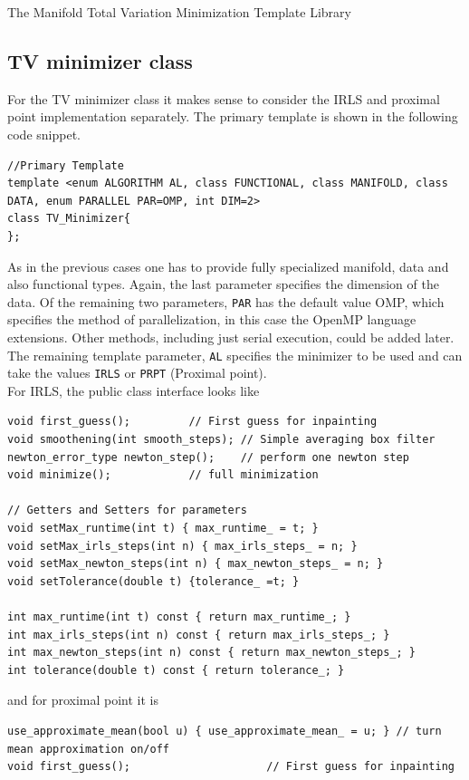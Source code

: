 \begin{chapter}{The Manifold Total Variation Minimization Template Library}
\subsection{TV minimizer class} %
\label{sub:TVMinimizer class}
For the TV minimizer class it makes sense to consider the IRLS and proximal point implementation separately. The primary template is shown in the following code snippet.
\cppinline
\begin{lstlisting}
//Primary Template 
template <enum ALGORITHM AL, class FUNCTIONAL, class MANIFOLD, class DATA, enum PARALLEL PAR=OMP, int DIM=2>
class TV_Minimizer{ 
};
\end{lstlisting}
As in the previous cases one has to provide fully specialized manifold, data and also functional types. Again, the last parameter specifies the dimension of the data. Of the
remaining two parameters, \texttt{PAR} has the default value OMP, which specifies the method of parallelization, in this case the OpenMP language extensions. Other methods, including just serial
execution, could be added later. The remaining template parameter, \texttt{AL} specifies the minimizer to be used and can take the values \texttt{IRLS} or \texttt{PRPT} (Proximal point).\\

For IRLS, the public class interface looks like\\
\cppinline
\begin{lstlisting}
void first_guess();		    // First guess for inpainting
void smoothening(int smooth_steps); // Simple averaging box filter
newton_error_type newton_step();    // perform one newton step
void minimize();		    // full minimization

// Getters and Setters for parameters
void setMax_runtime(int t) { max_runtime_ = t; }
void setMax_irls_steps(int n) { max_irls_steps_ = n; }
void setMax_newton_steps(int n) { max_newton_steps_ = n; }
void setTolerance(double t) {tolerance_ =t; }
	    
int max_runtime(int t) const { return max_runtime_; }
int max_irls_steps(int n) const { return max_irls_steps_; }
int max_newton_steps(int n) const { return max_newton_steps_; }
int tolerance(double t) const { return tolerance_; }
\end{lstlisting}

and for proximal point it is\\
\cppinline
\begin{lstlisting}
use_approximate_mean(bool u) { use_approximate_mean_ = u; } // turn mean approximation on/off
void first_guess();					    // First guess for inpainting
 

\end{lstlisting}
\end{chapter}
